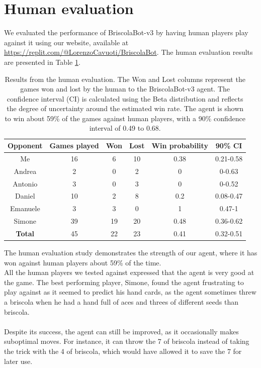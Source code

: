 \section{Human evaluation}
We evaluated the performance of BriscolaBot-v3 by having human players play against it using our website, available at \url{https://replit.com/@LorenzoCavuoti/BriscolaBot}. The human evaluation results are presented in Table \ref{tab:human-evaluation}.

\begin{table}[H]
    \centering
    \begin{tabular}{cccccc}
        \hline
        Opponent & Games played & Won & Lost & Win probability & 90\% CI\\
        \hline
        Me & 16 & 6 & 10 & 0.38 & 0.21-0.58\\
        Andrea & 2 & 0 & 2 & 0 & 0-0.63\\
        Antonio & 3 & 0 & 3 & 0 & 0-0.52\\
        Daniel & 10 & 2 & 8 & 0.2 & 0.08-0.47\\
        Emanuele & 3 & 3 & 0 & 1 & 0.47-1\\
        Simone & 39 & 19 & 20 & 0.48 & 0.36-0.62\\
        \hline
        \textbf{Total} & 45 & 22 & 23 & 0.41 & 0.32-0.51\\
    \end{tabular}
    \caption{Results from the human evaluation. The Won and Lost columns represent the games won and lost by the human to the BriscolaBot-v3 agent. The confidence interval (CI) is calculated using the Beta distribution and reflects the degree of uncertainty around the estimated win rate. The agent is shown to win about 59\% of the games against human players, with a 90\% confidence interval of 0.49 to 0.68.}
    \label{tab:human-evaluation}
\end{table}
The human evaluation study demonstrates the strength of our agent, where it has won against human players about 59\% of the time.\\
All the human players we tested against expressed that the agent is very good at the game. The best performing player, Simone, found the agent frustrating to play against as it seemed to predict his hand cards, as the agent sometimes threw a briscola when he had a hand full of aces and threes of different seeds than briscola.\\\\
Despite its success, the agent can still be improved, as it occasionally makes suboptimal moves. For instance, it can throw the 7 of briscola instead of taking the trick with the 4 of briscola, which would have allowed it to save the 7 for later use.

